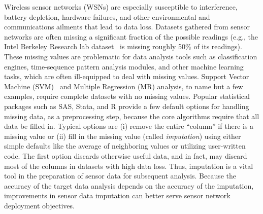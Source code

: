
Wireless sensor networks (WSNs) are especially susceptible to interference,
battery depletion, hardware failures, and other environmental and communications ailments
that lead to data loss.  Datasets gathered from sensor networks are
often missing a significant fraction of the possible readings
(e.g., the Intel Berkeley Research lab dataset~\cite{berkeley2004lab}
is missing roughly 50\% of its readings).
These missing values are problematic for data analysis tools such as
classification engines, time-sequence pattern analysis modules, and
other machine learning tasks, which are often ill-equipped to deal
with missing values.  Support Vector Machine
(SVM)~\cite{vapnik2000nature} and Multiple Regression (MR) analysis,
to name but a few examples, require complete datasets with no missing
values.  Popular statistical packages such as SAS, Stata, and R
provide a few default options for handling missing data, as a
preprocessing step, because the core algorithms require that all data be filled
in.  Typical options are (i) remove the entire ``column'' if there is a
missing value or (ii) fill in the missing value (called {\em
imputation}) using either simple defaults like the average of
neighboring values or utilizing user-written code.  The first option discards
otherwise useful data, and in fact, may discard most of the columns in
datasets with high data loss.  Thus, imputation is a vital tool in the
preparation of sensor data for subsequent analysis. Because the
accuracy of the target data analysis depends on the accuracy of the
imputation, improvements in sensor data imputation can better serve
sensor network deployment objectives.


